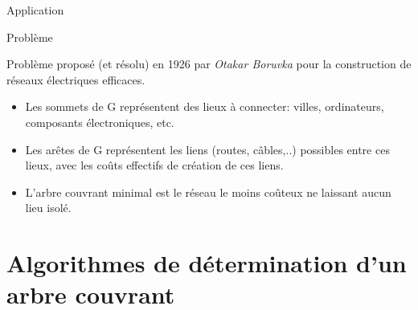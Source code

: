 \documentclass[10pt,xcolor=dvipsnames]{beamer}
\begin{document}
\begin{frame}{Application}
\begin{exampleblock}{Problème}
    

    Problème proposé (et résolu) en 1926 par \textit{Otakar Boruvka} pour la construction de réseaux électriques efficaces.
    
    \begin{itemize}
        \item Les sommets de G représentent des lieux à connecter: villes, ordinateurs, composants électroniques, etc.
        \item Les arêtes de G représentent les liens (routes, câbles,..) \alert{possibles} entre ces lieux, avec les coûts effectifs de création de ces liens.
        \item L'arbre couvrant minimal est le réseau le moins coûteux ne laissant aucun lieu isolé.
    \end{itemize}
\end{exampleblock}
\end{frame}

\section{Algorithmes de détermination d'un arbre couvrant}
\end{document}
